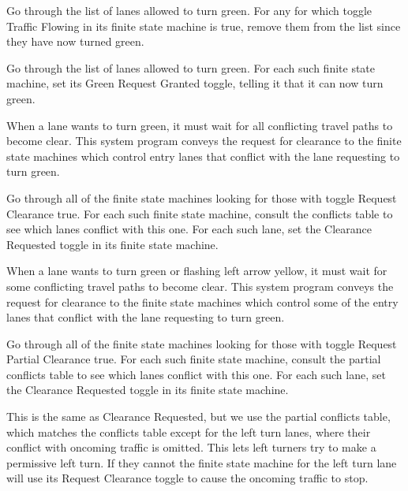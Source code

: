 \documentclass[letterpaper,twoside]{article}
\begin{document}
\begin{description}
  Go through the list of lanes allowed to turn green.  For any
  for which toggle Traffic Flowing in its finite state machine is true,
  remove them from the list since they have now turned green.

  Go through the list of lanes allowed to turn green.  For each
  such finite state machine, set its Green Request Granted toggle, telling it
  that it can now turn green.

\item[Clearance Requested]

  When a lane wants to turn green,
  it must wait for all conflicting
  travel paths to become clear.  This system program conveys the request
  for clearance to the finite state machines which control entry lanes
  that conflict with the lane requesting to turn green.

  Go through all of the finite state machines looking for those with toggle
  Request Clearance true.  For each such finite state machine,
  consult the conflicts table to see which lanes conflict with this one.
  For each such lane, set the Clearance Requested toggle in its finite
  state machine.

\item[Partial Clearance Requested]

  When a lane wants to turn green or flashing left arrow yellow,
  it must wait for some conflicting
  travel paths to become clear.
  This system program conveys the request
  for clearance to the finite state machines which control some of the
  entry lanes
  that conflict with the lane requesting to turn green.

  Go through all of the finite state machines looking for those with toggle
  Request Partial Clearance true.  For each such finite state machine,
  consult the partial conflicts table to see which lanes conflict
  with this one.  For each such lane, set the Clearance Requested toggle
  in its finite state machine.

  This is the same as Clearance Requested, but we use the partial
  conflicts table, which matches the conflicts table except
  for the left turn lanes, where their conflict with oncoming traffic is
  omitted.
  This lets left turners try to make a permissive left turn.
  If they cannot the finite state machine for the left turn lane
  will use its Request Clearance
  toggle to cause the oncoming traffic to stop.

\item[Conflicting Paths are Clear]


\end{description}
\end{document}
